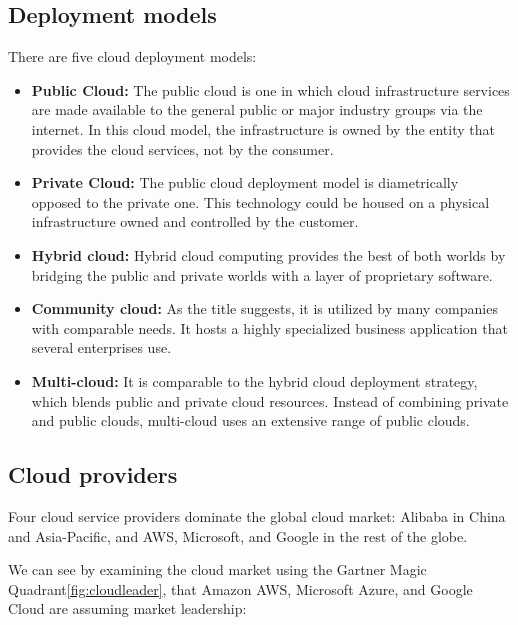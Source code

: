 \subsection{Deployment models} 
\qquad There are five cloud deployment models:

\begin{itemize}[label=\textbullet]
    \item \textbf{Public Cloud:} The public cloud is one in which cloud infrastructure services are made available to the general public or major industry groups via the internet. In this cloud model, the infrastructure is owned by the entity that provides the cloud services, not by the consumer.
    \item \textbf{Private Cloud:} The public cloud deployment model is diametrically opposed to the private one. This technology could be housed on a physical infrastructure owned and controlled by the customer.
    \item \textbf{Hybrid cloud:} Hybrid cloud computing provides the best of both worlds by bridging the public and private worlds with a layer of proprietary software.
    \newpage
    \item \textbf{Community cloud:} As the title suggests, it is utilized by many companies with comparable needs. It hosts a highly specialized business application that several enterprises use.
    \item \textbf{Multi-cloud:} It is comparable to the hybrid cloud deployment strategy, which blends public and private cloud resources. Instead of combining private and public clouds, multi-cloud uses an extensive range of public clouds.
\end{itemize} 

\subsection{Cloud providers}
\qquad Four cloud service providers dominate the global cloud market: Alibaba in China and Asia-Pacific, and AWS, Microsoft, and Google in the rest of the globe.

 We can see by examining the cloud market using the Gartner Magic Quadrant\ref{fig:cloudleader}, that Amazon AWS, Microsoft Azure, and Google Cloud are assuming market leadership:


